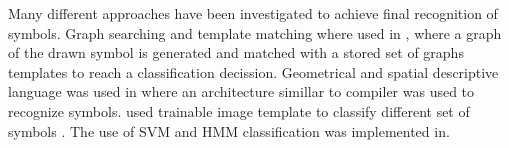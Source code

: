 \documentclass[a4paper,10pt]{IEEEconf}
\begin{document}
Many different approaches have been investigated to achieve final recognition of symbols. Graph searching and template matching where used in \cite{mulitstroke5,GraphBased07}, where a graph of the drawn symbol is generated and matched with a stored set of graphs templates to reach a classification decission. Geometrical and spatial descriptive language was used in \cite{SketchRead2007,Ladder30} where an architecture simillar to compiler was used to recognize symbols. \citeauthor{imagetrainable48} used trainable image template to classify different set of symbols \cite{imagetrainable48}. The use of SVM and HMM classification was implemented in\cite{SVM300,SmartSketch56,HMM53}.
\end{document}
